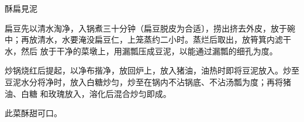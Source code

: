 \begin{recipe}{酥扁見泥}

\ingredients


\preparation

\step 扁豆先以清水淘净，入锅煮三十分钟（扁豆脱皮为合适〕，捞出挤去外皮，放于碗
中；再放清水，水要淹没扁豆仁，上笼蒸约二小时。蒸烂后取出，放筲箕内滤干水，然后
放于干净的菜墩上，用漏瓢压成豆泥，以能通过漏瓢的细孔为度。

\step 炒锅烧红后提起，以净布揩净，放回炉上，放入猪油，油热时即将豆泥放入。炒至
豆泥水分将净时，放入白糖炒匀，炒至在锅内不沾锅底、不沾汤瓢为度；再将猪油、白糖
和玫瑰放入，溶化后混合炒匀即成。

\features

此菜酥甜可口。

\end{recipe}

